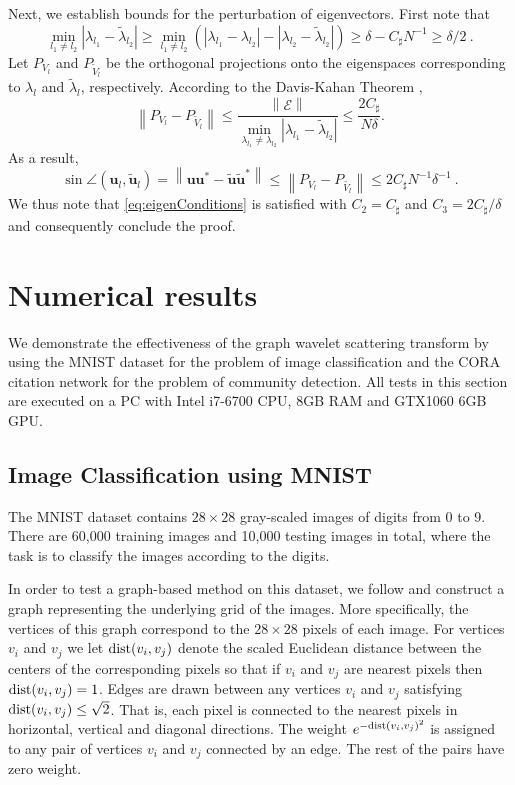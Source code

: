 \documentclass{article}
\def\l{\lambda}
\def\Bu{\boldsymbol{u}}
\def\BvE{\boldsymbol{\mathcal{E}}}
\newcommand{\dist}{\textup{\mbox{dist}}}
\newcommand{\abs}[1]{\left| #1 \right|}
\newcommand{\norm}[1]{\left\lVert#1\right\rVert}
\begin{document}
{Next, we establish bounds for the perturbation of eigenvectors. First note that
\begin{equation*}
    \min_{{l_1} \neq {l_2}} \abs{\l_{l_1} - \tilde{\l}_{l_2}} \geq \min_{{l_1} \neq {l_2}} \left( \abs{\l_{l_1} - \l_{l_2}} - |\l_{l_2} - \tilde{\l}_{l_2}| \right) \geq \delta - C_{\sharp} N^{-1} \geq \delta/2 ~.
\end{equation*}
Let $P_{V_l}$ and $P_{\tilde{V}_l}$ be the orthogonal projections onto the eigenspaces corresponding to $\l_l$ and $\tilde{\l}_l$, respectively. According to the Davis-Kahan Theorem \cite{DavK70, YuWS14}, 
\begin{equation}
    \norm{P_{V_l} - P_{\tilde{V}_l}} \leq \frac{\norm{\BvE}}{\min_{\l_{l_1} \neq \l_{l_2}} \abs{\l_{l_1} - \tilde{\l}_{l_2}}} \leq \frac{2 C_{\sharp}}{N \delta}.
\end{equation}
As a result,
\begin{equation}
    \sin \angle (\Bu_l, \tilde{\Bu}_l) = \norm{\Bu \Bu^* - \tilde{\Bu} \tilde{\Bu}^*} \leq \norm{P_{V_l} - P_{\tilde{V_l}}} \leq 2 C_{\sharp} N^{-1} \delta^{-1} ~.
\end{equation}
We thus note that \eqref{eq:eigenConditions} is satisfied with $C_2 = C_{\sharp}$ and $C_3 = 2 C_{\sharp}/\delta$ and consequently conclude the proof.
}


\section{Numerical results}\label{sec:numerical}
We 
demonstrate the effectiveness of the graph wavelet scattering transform
by using the MNIST dataset for the problem of image classification and the CORA citation network for the problem of community detection. All tests in this section are executed on a PC with Intel i7-6700 CPU, 8GB RAM and GTX1060 6GB GPU. 

\subsection{Image Classification using MNIST}\label{sec:mnist}
The MNIST dataset \cite{LecB98} 
contains $28 \times 28$ gray-scaled images of digits from 0 to 9. 
There are 60,000 training images and 10,000 testing images in total, where the task is to classify the images according to the digits.

In order to test a graph-based method on this dataset, we follow \cite{DefBV16} and construct a graph representing the underlying grid of the images. More specifically, the vertices of this graph correspond to the $28 \times 28$ pixels of each image. For vertices $v_i$ and $v_j$ we let $\dist(v_i,v_j)$ denote the scaled Euclidean distance between the centers of the corresponding pixels so that if $v_i$ and $v_j$ are nearest pixels then $\dist(v_i,v_j)=1$. Edges are drawn between any vertices $v_i$ and $v_j$ satisfying $\dist(v_i,v_j) \leq \sqrt{2}$. That is, each pixel is connected to the nearest pixels in horizontal, vertical and diagonal directions. 
The weight $e^{-\dist(v_i,v_j)^2}$ is assigned to any pair of vertices $v_i$ and $v_j$ connected by an edge. The rest of the pairs have zero weight. 
\end{document}
